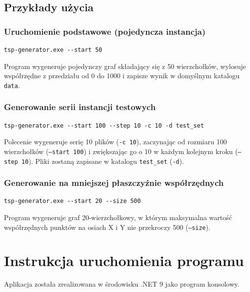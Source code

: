 \documentclass{article}
\theoremstyle{definition}
\theoremstyle{plain}
\theoremstyle{remark}
\begin{document}
\subsection{Przykłady użycia}

\subsubsection*{Uruchomienie podstawowe (pojedyncza instancja)}

\begin{verbatim}
tsp-generator.exe --start 50
\end{verbatim}

\noindent
Program wygeneruje pojedynczy graf składający się z 50 wierzchołków, wylosuje współrzędne z przedziału od 0 do 1000 i zapisze wynik w domyślnym katalogu \texttt{data}.

\subsubsection*{Generowanie serii instancji testowych}

\begin{verbatim}
tsp-generator.exe --start 100 --step 10 -c 10 -d test_set
\end{verbatim}

Polecenie wygeneruje serię 10 plików (\texttt{-c 10}), zaczynając od rozmiaru 100 wierzchołków (\texttt{--start 100}) i zwiększając go o 10 w każdym kolejnym kroku (\texttt{--step 10}). Pliki zostaną zapisane w katalogu \texttt{test\_set} (\texttt{-d}).

\subsubsection*{Generowanie na mniejszej płaszczyźnie współrzędnych}

\begin{verbatim}
tsp-generator.exe --start 20 --size 500
\end{verbatim}

Program wygeneruje graf 20-wierzchołkowy, w którym maksymalna wartość współrzędnych punktów na osiach X i Y nie przekroczy 500 (\texttt{--size}).

\newpage
\section{Instrukcja uruchomienia programu}

Aplikacja została zrealizowana w środowisku .NET 9 jako program konsolowy.
\end{document}
